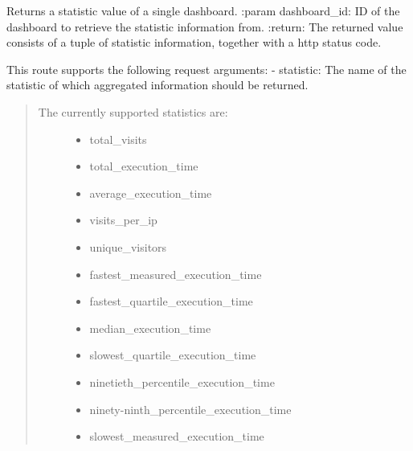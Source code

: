 \documentclass[letterpaper,10pt,english]{sphinxmanual}
\begin{document}

\begin{fulllineitems}
\label{\detokenize{pydash_web.controller.dashboard_statistic:pydash_web.controller.dashboard_statistic.dashboard_statistic}}
Returns a statistic value of a single dashboard.
:param dashboard\_id: ID of the dashboard to retrieve the statistic information from.
:return: The returned value consists of a tuple of statistic information, together with a http status code.

This route supports the following request arguments:
- statistic: The name of the statistic of which aggregated information should be returned.
\begin{quote}
\begin{description}
\item[{The currently supported statistics are:}] \leavevmode\begin{itemize}
\item {} 
total\_visits

\item {} 
total\_execution\_time

\item {} 
average\_execution\_time

\item {} 
visits\_per\_ip

\item {} 
unique\_visitors

\item {} 
fastest\_measured\_execution\_time

\item {} 
fastest\_quartile\_execution\_time

\item {} 
median\_execution\_time

\item {} 
slowest\_quartile\_execution\_time

\item {} 
ninetieth\_percentile\_execution\_time

\item {} 
ninety-ninth\_percentile\_execution\_time

\item {} 
slowest\_measured\_execution\_time


\end{itemize}
\end{description}
\end{quote}
\end{fulllineitems}
\end{document}
